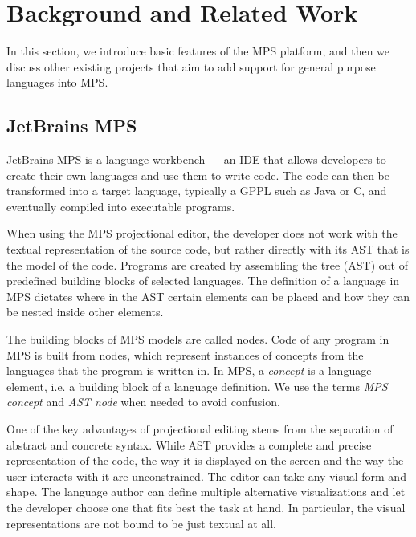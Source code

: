\section{Background and Related Work}
\label{sect:BACKGRELWORK}

In this section, we introduce basic features of the MPS platform, and then we discuss other existing projects that aim to add support for general purpose languages into MPS.

\subsection{JetBrains MPS}
\label{sect:MPS}

JetBrains MPS is a language workbench --- an IDE that allows developers to create their own languages and use them to write code.
The code can then be transformed into a target language, typically a GPPL such as Java or C, and eventually compiled into executable programs.

When using the MPS projectional editor, the developer does not work with the textual representation of the source code, but rather directly with its AST that is the model of the code.
Programs are created by assembling the tree (AST) out of predefined building blocks of selected languages.
The definition of a language in MPS dictates where in the AST certain elements can be placed and how they can be nested inside other elements.

The building blocks of MPS models are called nodes.
Code of any program in MPS is built from nodes, which represent instances of concepts from the languages that the program is written in.
In MPS, a \emph{concept} is a language element, i.e. a building block of a language definition.
We use the terms \emph{MPS concept} and \emph{AST node} when needed to avoid confusion.

One of the key advantages of projectional editing stems from the separation of abstract and concrete syntax.
While AST provides a complete and precise representation of the code, the way it is displayed on the screen and the way the user interacts with it are unconstrained.
The editor can take any visual form and shape.
The language author can define multiple alternative visualizations and let the developer choose one that fits best the task at hand.
In particular, the visual representations are not bound to be just textual at all.

